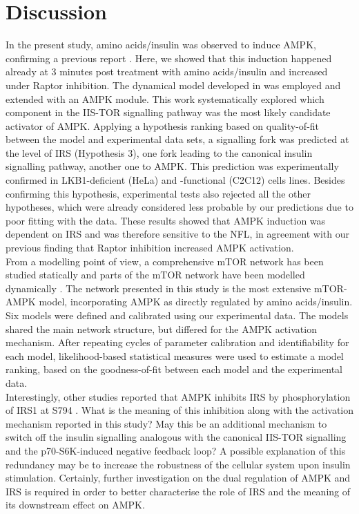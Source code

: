 \section{Discussion}
\label{paper2-sec:Discussion}
In the present study, amino acids/insulin was observed to induce AMPK, confirming a previous report \citep{Suzuki2004}. Here, we showed that this induction happened already at 3 minutes post treatment with amino acids/insulin and increased under Raptor inhibition. The dynamical model developed in \citep{DallePezze2012a} was employed and extended with an AMPK module. This work systematically explored which component in the IIS-TOR signalling pathway was the most likely candidate activator of AMPK. Applying a hypothesis ranking based on quality-of-fit between the model and experimental data sets, a signalling fork was predicted at the level of IRS (Hypothesis 3), one fork leading to the canonical insulin signalling pathway, another one to AMPK. This prediction was experimentally confirmed in LKB1-deficient (HeLa) and -functional (C2C12) cells lines. Besides confirming this hypothesis, experimental tests also rejected all the other hypotheses, which were already considered less probable by our predictions due 
to poor fitting with the data. These results showed that AMPK induction was dependent on IRS and was therefore sensitive to the NFL, in agreement with our previous finding that Raptor inhibition increased AMPK activation.\\
From a modelling point of view, a comprehensive mTOR network has been studied statically \citep{Caron2010} and parts of the mTOR network have been modelled dynamically \citep{Sedaghat2002, Jain2009, Faratian2009, Vinod2009, Borisov2009, Kuepfer2007, Kiselyov2009, DallePezze2012a}. The network presented in this study is the most extensive mTOR-AMPK model, incorporating AMPK as directly regulated by amino acids/insulin. Six models were defined and calibrated using our experimental data. The models shared the main network structure, but differed for the AMPK activation mechanism. After repeating cycles of parameter calibration and identifiability for each model, likelihood-based statistical measures were used to estimate a model ranking, based on the goodness-of-fit between each model and the experimental data.\\
Interestingly, other studies reported that AMPK inhibits IRS by phosphorylation of IRS1 at S794 \citep{Ning2010, Tzatsos2007, Jakobsen2001}. What is the meaning of this inhibition along with the activation mechanism reported in this study? May this be an additional mechanism to switch off the insulin signalling analogous with the canonical IIS-TOR signalling and the p70-S6K-induced negative feedback loop? A possible explanation of this redundancy may be to increase the robustness of the cellular system upon insulin stimulation. Certainly, further investigation on the dual regulation of AMPK and IRS is required in order to better characterise the role of IRS and the meaning of its downstream effect on AMPK.\\

